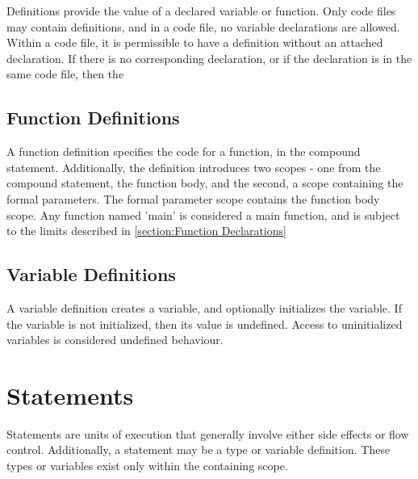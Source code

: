 \documentclass[letterpaper,12pt]{book}
\begin{document}


Definitions provide the value of a declared variable or function. Only code files may contain definitions, and in a code file, no variable declarations are allowed. Within a code file, it is permissible to have a definition without an attached declaration. If there is no corresponding declaration, or if the declaration is in the same code file, then the 

\section{Function Definitions}



A function definition specifies the code for a function, in the compound statement. Additionally, the definition introduces two scopes - one from the compound statement, the function body, and the second, a scope containing the formal parameters. The formal parameter scope contains the function body scope. Any function named 'main' is considered a main function, and is subject to the limits described in \ref{section:Function Declarations}

\section{Variable Definitions}



A variable definition creates a variable, and optionally initializes the variable. If the variable is not initialized, then its value is undefined. Access to uninitialized variables is considered undefined behaviour.

\chapter{Statements}



Statements are units of execution that generally involve either side effects or flow control. Additionally, a statement may be a type or variable definition. These types or variables exist only within the containing scope.
\end{document}
